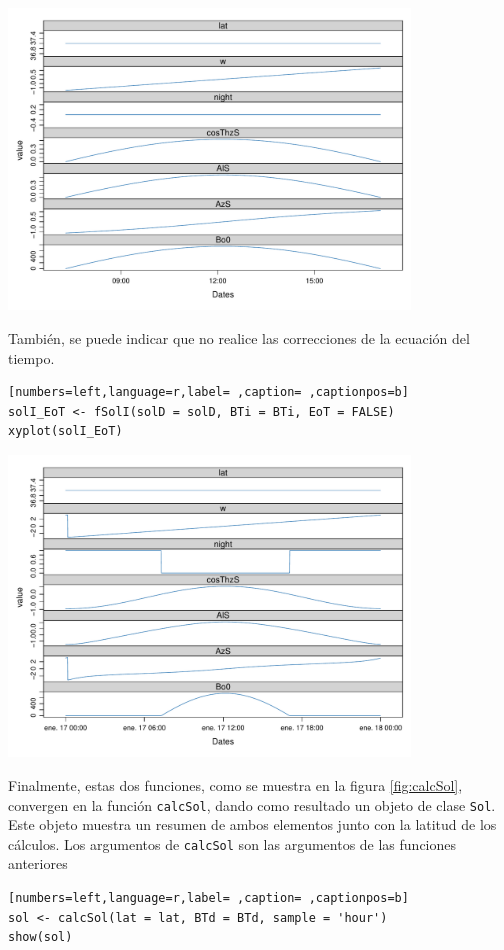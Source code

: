 \begin{center}
\includegraphics[width=0.8\textwidth]{figuras/codigo-solIBTi.pdf}
\end{center}
  También, se puede indicar que no realice las correcciones de la ecuación del tiempo.
\begin{lstlisting}[numbers=left,language=r,label= ,caption= ,captionpos=b]
solI_EoT <- fSolI(solD = solD, BTi = BTi, EoT = FALSE)
xyplot(solI_EoT)
\end{lstlisting}

\begin{center}
\includegraphics[width=0.8\textwidth]{figuras/codigo-solIEoT.pdf}
\end{center}

Finalmente, estas dos funciones, como se muestra en la figura \ref{fig:calcSol}, convergen en la función \texttt{calcSol}, dando como resultado un objeto de clase \texttt{Sol}. Este objeto muestra un resumen de ambos elementos junto con la latitud de los cálculos. Los argumentos de \texttt{calcSol} son las argumentos de las funciones anteriores
\begin{lstlisting}[numbers=left,language=r,label= ,caption= ,captionpos=b]
sol <- calcSol(lat = lat, BTd = BTd, sample = 'hour')
show(sol)
\end{lstlisting}

